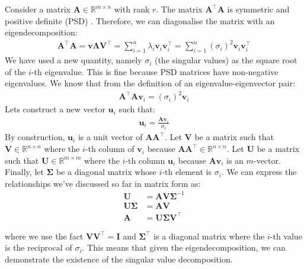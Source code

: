 \documentclass[a4paper,12pt]{article}
\newcommand{\matrx}[1]{\bm{#1}}
\newcommand{\vectr}[1]{\textbf{#1}}
\newcommand{\real}{\mathbb{R}}
\begin{document}
	Consider a matrix $ \matrx{A} \in \real^{m \times n} $ with rank $ r $. The matrix $ \matrx{A}^{\top} \matrx{A} $ is symmetric and positive definite (PSD) \cite{schwerdtfeger1961introduction}. Therefore, we can diagonalise the matrix with an eigendecomposition:
	\begin{align}
		\matrx{A}^{\top}\matrx{A} = \matrx{v}\matrx{\Lambda}\matrx{V}^{\top} =  \sum_{i = 1}^{n} \lambda_i \vectr{v}_i \vectr{v}_{i}^\top = \sum_{i = 1}^{n} (\sigma_i)^2 \vectr{v}_i \vectr{v}_{i}^\top
	\end{align}
	We have used a new quantity, namely $ \sigma_i $ (the singular values) as the square root of the $ i $-th eigenvalue. This is fine because PSD matrices have non-negative eigenvalues. We know that from the definition of an eigenvalue-eigenvector pair:
	\begin{align}
		\matrx{A}^\top \matrx{A} \vectr{v}_i = (\sigma_i)^2 \vectr{v}_i
	\end{align}
	Lets construct a new vector $ \vectr{u}_i $ such that: 
	\begin{align}
		\vectr{u}_i = \frac{\matrx{A}\vectr{v}_i}{\sigma_i}
	\end{align}
	By construction, $ \vectr{u}_i $ is a unit vector of $ \matrx{A}\matrx{A}^{\top} $. Let $ \matrx{V} $ be a matrix such that $ \matrx{V} \in \real^{n \times n} $ where the $ i $-th column of $ \vectr{v}_i $ because $ \matrx{A}\matrx{A}^\top \in \real^{n \times n}$. Let $ \matrx{U} $ be a matrix such that $ \matrx{U} \in \real^{m \times m}$  where the $ i $-th column $ \vectr{u}_i $ because $ \matrx{A}\vectr{v}_i $ is an $ m $-vector. Finally, let $ \matrx{\Sigma} $ be a diagonal matrix  whose $ i $-th element is $ \sigma_i $. We can express the relationships we've discussed so far in matrix form as:
	\begin{align}
		\matrx{U} &= \matrx{A}\matrx{V}\matrx{\Sigma}^{-1} \\
		\matrx{U}\matrx{\Sigma} &= \matrx{A}\matrx{V} \\
		\matrx{A} &= \matrx{U}\matrx{\Sigma}\matrx{V}^\top
	\end{align}
	
	where we use the fact $ \matrx{V}\matrx{V}^{\top} = \matrx{I} $ and $ \matrx{\Sigma}^\top $ is a diagonal matrix where the $ i $-th value is the reciprocal of $ \sigma_i $. This means that given the eigendecomposition, we can demonstrate the existence of the singular value decomposition. 
	
\end{document}
